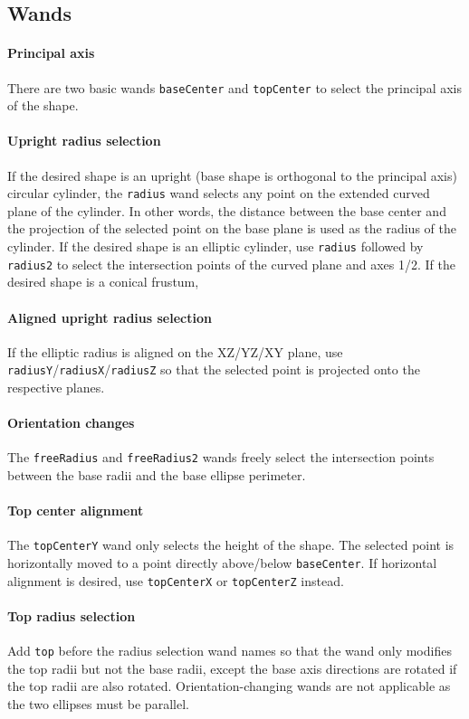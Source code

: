 \documentclass{report}
\begin{document}
				\subsection{Wands}
					\paragraph{Principal axis} There are two basic wands \texttt{baseCenter} and \texttt{topCenter} to
					select the principal axis of the shape.
					\paragraph{Upright radius selection} If the desired shape is an upright (base shape is orthogonal
					to the principal axis) circular cylinder, the \texttt{radius} wand selects any point on the
					extended curved plane of the cylinder. In other words, the distance between the base center and the
					projection of the selected point on the base plane is used as the radius of the cylinder. If the
					desired shape is an elliptic cylinder, use \texttt{radius} followed by \texttt{radius2} to select
					the intersection points of the curved plane and axes 1/2. If the desired shape is a conical
					frustum,
					\paragraph{Aligned upright radius selection} If the elliptic radius is aligned on the XZ/YZ/XY
					plane, use \texttt{radiusY}/\texttt{radiusX}/\texttt{radiusZ} so that the selected point is
					projected onto the respective planes.
					\paragraph{Orientation changes} The \texttt{freeRadius} and \texttt{freeRadius2} wands freely
					select the intersection points between the base radii and the base ellipse perimeter.
					\paragraph{Top center alignment} The \texttt{topCenterY} wand only selects the height of the shape.
					The selected point is horizontally moved to a point directly above/below \texttt{baseCenter}. If
					horizontal alignment is desired, use \texttt{topCenterX} or \texttt{topCenterZ} instead.
					\paragraph{Top radius selection} Add \texttt{top} before the radius selection wand names so that
					the wand only modifies the top radii but not the base radii, except the base axis directions are
					rotated if the top radii are also rotated. Orientation-changing wands are not applicable as the two
					ellipses must be parallel.
\end{document}
